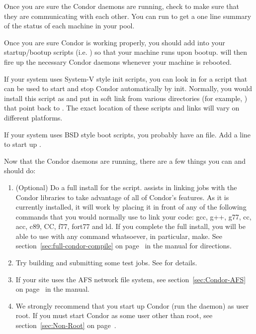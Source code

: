 Once you are sure the Condor daemons are running, check to make sure
that they are communicating with each other.  You can run
 to get a one line summary of the status of each
machine in your pool.

Once you are sure Condor is working properly, you should add
 into your startup/bootup scripts (i.e.  ) so
that your machine runs  upon bootup.  
will then fire up the necessary Condor daemons whenever your machine
is rebooted.  

If your system uses System-V style init scripts, you can look in
 for a script that can be used
to start and stop Condor automatically by init.  Normally, you would
install this script as  and put in soft link from
various directories (for example, ) that point back to
.  The exact location of these scripts and links
will vary on different platforms.

If your system uses BSD style boot scripts, you probably have an
 file.  Add a line to start up
.


Now that the Condor daemons are running, there are a few things you
can and should do:

\begin{enumerate}
\item (Optional) Do a full install for the  script.
     assists in linking jobs with the Condor libraries
    to take advantage of all of Condor's features.  As it is currently
    installed, it will work by placing it in front of any of the
    following commands that you would normally use to link your code:
    gcc, g++, g77, cc, acc, c89, CC, f77, fort77 and ld.  If you
    complete the full install, you will be able to use
     with any command whatsoever, in particular, make.
    See section~\ref{sec:full-condor-compile} on
    page~\pageref{sec:full-condor-compile} in the manual for
    directions.

\item Try building and submitting some test jobs.  See
     for details.

\item If your site uses the AFS network file system, see
section~\ref{sec:Condor-AFS} on page~\pageref{sec:Condor-AFS} in the
manual.

\item We strongly recommend that you start up Condor (run the
 daemon) as user root.  If you must start Condor as
some user other than root, see section~\ref{sec:Non-Root} on
page~\pageref{sec:Non-Root}.

\end{enumerate}

